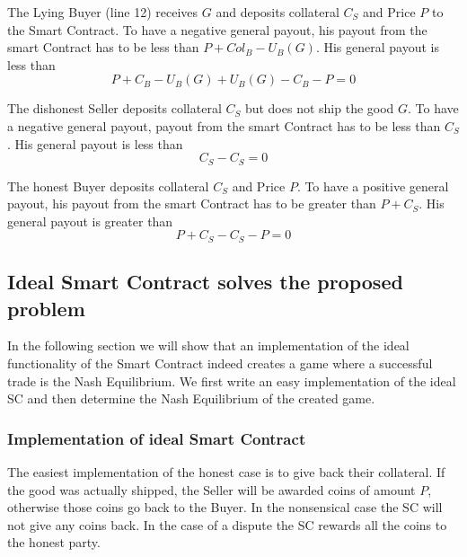 \documentclass{cacthesis}
\begin{document}
The Lying Buyer (line 12) receives $G$ and deposits collateral $C_S$ and Price $P$ to the Smart Contract. To have a negative general payout, his payout from the smart Contract has to be less than $P + Col_B - U_B(G)$. His general payout is less than
\[P + C_B - U_B(G) + U_B(G) - C_B -P = 0\]

The dishonest Seller deposits collateral $C_S$ but does not ship the good $G$. To have a negative general payout, payout from the smart Contract has to be less than $C_S$. His general payout is less than
\[C_S - C_S = 0\]

The honest Buyer deposits collateral $C_S$ and Price $P$. To have a positive general payout, his payout from the smart Contract has to be greater than $P + C_S$. His general payout is greater than
\[P + C_S - C_S - P = 0\]

\subsection{Ideal Smart Contract solves the proposed problem}
In the following section we will show that an implementation of the ideal functionality of the Smart Contract indeed creates a game where a successful trade is the Nash Equilibrium. We first write an easy implementation of the ideal SC and then determine the Nash Equilibrium of the created game.
\subsubsection{Implementation of ideal Smart Contract}
The easiest implementation of the honest case is to give back their collateral. If the good was actually shipped, the Seller will be awarded coins of amount $P$, otherwise those coins go back to the Buyer.\newline
In the nonsensical case the SC will not give any coins back.\newline
In the case of a dispute the SC rewards all the coins to the honest party.
\end{document}
